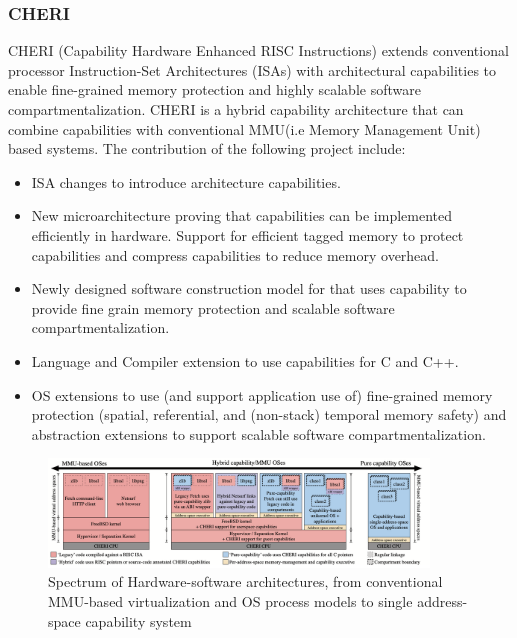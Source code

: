 
\subsubsection{CHERI \cite{CHERI}}
CHERI (Capability Hardware Enhanced RISC Instructions) extends conventional processor
Instruction-Set Architectures (ISAs) with architectural capabilities to enable fine-grained
memory protection and highly scalable software compartmentalization. CHERI is a hybrid 
capability architecture that can combine capabilities with conventional MMU(i.e Memory Management
 Unit) based systems. The contribution of the following project include: 
\begin{itemize}
  \item ISA changes to introduce architecture capabilities.
  \item New microarchitecture proving that capabilities can be implemented efficiently 
        in hardware. Support for efficient tagged memory to protect capabilities and
        compress capabilities to reduce memory overhead.   
  \item Newly designed software construction model for that uses capability to provide
        fine grain memory protection and scalable software compartmentalization.  
  \item Language and Compiler extension to use capabilities for C and C++.
  \item OS extensions to use (and support application use of) fine-grained memory protection
        (spatial, referential, and (non-stack) temporal memory safety) and abstraction extensions
        to support scalable software compartmentalization. 
\end{itemize}

\begin{figure}[htbp!] 
  \centering    
  \includegraphics[width=0.9\textwidth]{Cheri}
  \caption[Cheri]{Spectrum of Hardware-software architectures, from conventional MMU-based virtualization and OS process models to single address-space capability system \cite{CHERI}}
  \label{fig:Cheri}
  \end{figure}
	
